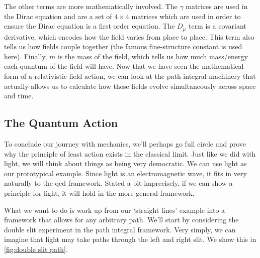 The other terms are more mathematically involved. The $\gamma$ matrices are used in the Dirac equation and are a set of $4\times 4$ matrices which are used in order to ensure the Dirac equation is a first order equation. The $D_\mu$ term is a covariant derivative, which encodes how the field varies from place to place. This term also tells us how fields couple together (the famous fine-structure constant is used here). Finally, $m$ is the mass of the field, which tells us how much mass/energy each quantum of the field will have. Now that we have seen the mathematical form of a relativistic field action, we can look at the path integral machinery that actually allows us to calculate how these fields evolve simultaneously across space and time.

\subsection{The Quantum Action}
To conclude our journey with mechanics, we'll perhaps go full circle and prove why the principle of least action exists in the classical limit. Just like we did with light, we will think about things as being very democratic. We can use light as our prototypical example. Since light is an electromagnetic wave, it fits in very naturally to the \gls{qed} framework. Stated a bit imprecisely, if we can show a principle for light, it will hold in the more general framework.

What we want to do is work up from our `straight lines' example into a framework that allows for any arbitrary path. We'll start by considering the double slit experiment in the path integral framework. Very simply, we can imagine that light may take paths through the left and right slit. We show this in \autoref{fig:double slit path}.

